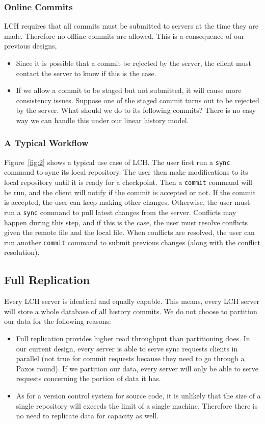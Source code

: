 \documentclass[11pt]{article}
\begin{document}
\subsubsection{Online Commits}
LCH requires that all commits must be submitted to servers at the time they are made.
Therefore no offline commits are allowed.
This is a consequence of our previous designs,
\begin{itemize}
    \item Since it is possible that a commit be rejected by the server, the client must contact the server to know if this is the case.
    \item If we allow a commit to be staged but not submitted, it will cause more consistency issues.
        Suppose one of the staged commit turns out to be rejected by the server.
        What should we do to its following commits?
        There is no easy way we can handle this under our linear history model.
\end{itemize}

\subsubsection{A Typical Workflow}
Figure~\ref{fig:2} shows a typical use case of LCH.
The user first run a \texttt{sync} command to sync its local repository.
The user then make modifications to its local repository until it is ready for a checkpoint.
Then a \texttt{commit} command will be run, and the client will notify if the commit is accepted or not.
If the commit is accepted, the user can keep making other changes.
Otherwise, the user must run a \texttt{sync} command to pull latest changes from the server.
Conflicts may happen during this step, and if this is the case, the user must resolve conflicts given the remote file and the local file.
When conflicts are resolved, the user can run another \texttt{commit} command to submit previous changes (along with the conflict resolution).

\subsection{Full Replication}
Every LCH server is identical and equally capable.
This means, every LCH server will store a whole database of all history commits.
We do not choose to partition our data for the following reasons:
\begin{itemize}
    \item Full replication provides higher read throughput than partitioning does.
        In our current design, every server is able to serve sync requests clients in parallel
        (not true for commit requests because they need to go through a Paxos round).
        If we partition our data, every server will only be able to serve requests concerning the portion of data it has.
    \item As for a version control system for source code, it is unlikely that the size of a single repository will exceeds the limit of a single machine.
        Therefore there is no need to replicate data for capacity as well.
\end{itemize}
\end{document}
